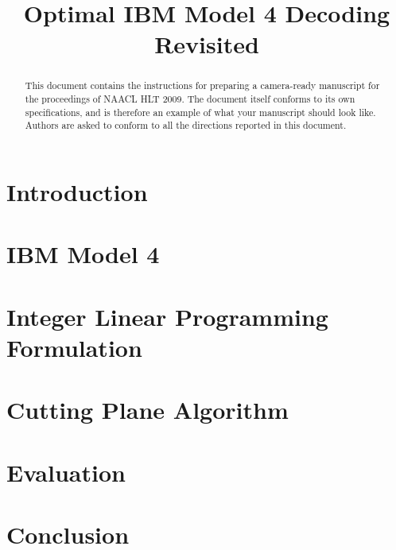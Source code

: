 \documentclass[english,11pt]{article}
\title{Optimal IBM Model 4 Decoding Revisited}
\date{}
\theoremstyle{plain}
\theoremstyle{plain}
\theoremstyle{plain}
\begin{document}
\maketitle
\begin{abstract}
  This document contains the instructions for preparing a camera-ready
  manuscript for the proceedings of NAACL HLT 2009. The document itself conforms
  to its own specifications, and is therefore an example of what
  your manuscript should look like.  Authors are asked to conform to
  all the directions reported in this document.
\end{abstract}

\section{Introduction}
\label{sec:introduction}


\section{IBM Model 4} 
\label{sec:ibm-model-4}
 
 
\section{Integer Linear Programming Formulation}
\label{sec:ilp}


\section{Cutting Plane Algorithm}
\label{sec:cutting-plane}


\section{Evaluation}
\label{sec:evaluation}


\section{Conclusion}
\label{sec:conclusion}




\end{document}
